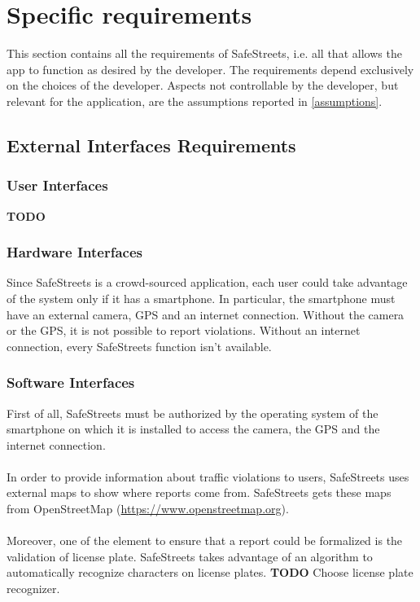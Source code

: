 \documentclass{article}
\begin{document}
	\section{Specific requirements}
		This section contains all the requirements of SafeStreets, i.e. all that allows the app to function as desired by the developer. The requirements depend exclusively on the choices of the developer. Aspects not controllable by the developer, but relevant for the application, are the assumptions reported in \ref{assumptions}.
		
		\subsection{External Interfaces Requirements}
		
			\subsubsection{User Interfaces}
				\textbf{TODO}
				
			\subsubsection{Hardware Interfaces} \label{hardware_interfaces}
				Since SafeStreets is a crowd-sourced application, each user could take advantage of the system only if it has a smartphone. In particular, the smartphone must have an external camera, GPS and an internet connection.
				Without the camera or the GPS, it is not possible to report violations. Without an internet connection, every SafeStreets function isn't available.
				
			\subsubsection{Software Interfaces}
				First of all, SafeStreets must be authorized by the operating system of the smartphone on which it is installed to access the camera, the GPS and the internet connection.\\
				\\
				In order to provide information about traffic violations to users, SafeStreets uses external maps to show where reports come from. SafeStreets gets these maps from OpenStreetMap (\url{https://www.openstreetmap.org}).\\
				\\
				Moreover, one of the element to ensure that a report could be formalized is the validation of license plate. SafeStreets takes advantage of an algorithm to automatically recognize characters on license plates.
				\textbf{TODO} Choose license plate recognizer.
				
\end{document}
